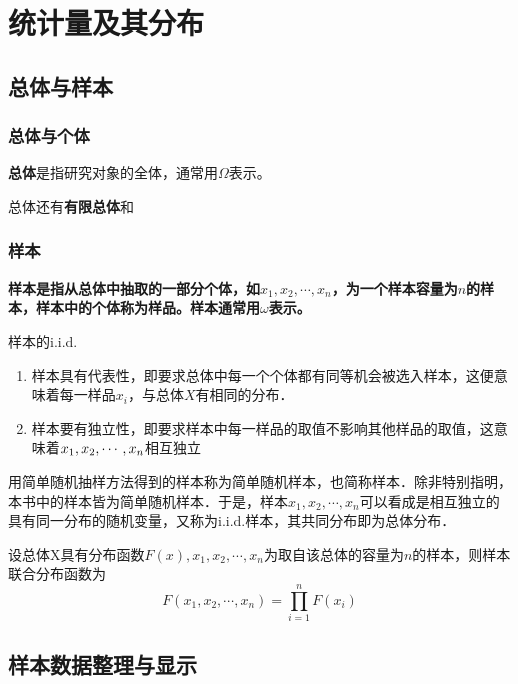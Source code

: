 \chapter[统计量及其分布]{统计量及其分布}
\section{总体与样本}
\subsection{总体与个体}
\begin{definition}
    \textbf{总体}是指研究对象的全体，通常用$\Omega$表示。

\end{definition}

总体还有\textbf{有限总体}和
\subsection{样本}
\begin{definition}
    \bf{样本}是指从总体中抽取的一部分个体，如$x_1,x_2 , \cdots,x_n$，为一个样本容量为$n$的样本，样本中的个体称为样品。样本通常用$\omega$表示。
\end{definition}
\begin{property} 样本的i.i.d.
    \begin{enumerate}
        \item 样本具有代表性，即要求总体中每一个个体都有同等机会被选入样本，这便意味着每一样品$x_i$，与总体$X$有相同的分布．
        \item 样本要有独立性，即要求样本中每一样品的取值不影响其他样品的取值，这意味着$x_1,x_2 , \cdots,\\x_n$相互独立
    \end{enumerate}
\end{property}

用简单随机抽样方法得到的样本称为简单随机样本，也简称样本．除非特别指明，
本书中的样本皆为简单随机样本．于是，样本$x_1,x_2 , \cdots,x_n$可以看成是相互独立的具有同一分布的随机变量，又称为i.i.d.样本，其共同分布即为总体分布．

设总体X具有分布函数$F(x),x_1,x_2 , \cdots,x_n$为取自该总体的容量为$n$的样本，则样本联合分布函数为
$$
    F(x_{1},x_{2},\cdots,x_{n})=\prod_{i=1}^{n}F(x_{i})
$$

\section{样本数据整理与显示}
